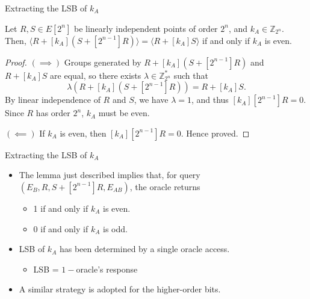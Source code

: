 \documentclass{beamer}
\begin{document}
\begin{frame}{Extracting the LSB of $k_A$}
    \begin{lemma}
        Let $R,S\in E[2^n]$ be linearly independent points of order $2^n$, and $k_A\in\mathbb{Z}_{2^n}$. Then, $\langle R+[k_A](S+[2^{n-1}]R)\rangle = \langle R+[k_A] S\rangle$ if and only if $k_A$ is even.
    \end{lemma}
    \begin{proof}
        $(\implies)$ Groups generated by $R+[k_A](S+[2^{n-1}]R)$ and $R+[k_A] S$ are equal, so there exists $\lambda\in\mathbb{Z}^*_{2^n}$ such that
        \[ \lambda(R+[k_A](S+[2^{n-1}]R)) = R+[k_A] S. \]
        By linear independence of $R$ and $S$, we have $\lambda=1$, and thus $[k_A][2^{n-1}]R=0$. Since $R$ has order $2^n$, $k_A$ must be even.
        
        \medskip
        
        $(\impliedby)$ If $k_A$ is even, then $[k_A][2^{n-1}]R=0$. Hence proved.
    \end{proof}
\end{frame}

\begin{frame}{Extracting the LSB of $k_A$}
    \begin{itemize}
        \item The lemma just described implies that, for query $(E_B,R,S+[2^{n-1}]R,E_{AB})$, the oracle returns
        \begin{itemize}
            \item 1 if and only if $k_A$ is even.
            \item 0 if and only if $k_A$ is odd.
        \end{itemize}
        \item LSB of $k_A$ has been determined by a single oracle access.
        \begin{itemize}
            \item LSB = $1-$oracle's response
        \end{itemize}
        \item A similar strategy is adopted for the higher-order bits.
    \end{itemize} 
\end{frame}
\end{document}
